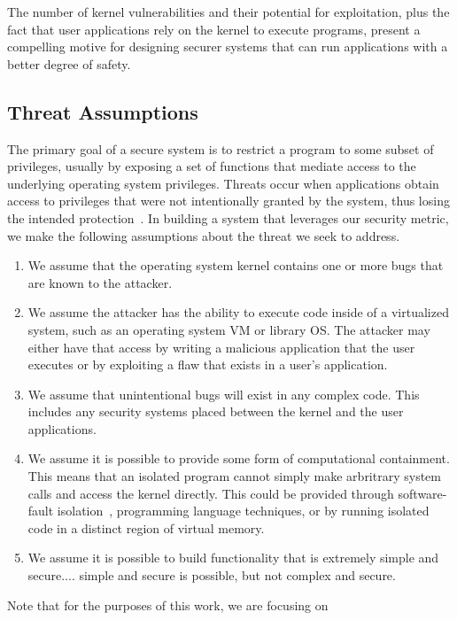 The number of kernel vulnerabilities and their potential for exploitation, 
plus the fact that user applications rely on the kernel to execute
programs, 
present a compelling motive for designing securer systems that can run
applications with a better degree of safety. 

\subsection{Threat Assumptions}

The primary goal of a secure system is to restrict a program to some subset
of privileges, 
usually by exposing a set of functions that mediate access to the
underlying operating system privileges. 
Threats occur when applications obtain access to privileges that were not
intentionally granted by the system, 
thus losing the intended protection~\cite{Repy-10}. In building a system
that leverages our security metric, 
we make the following assumptions about the threat we seek to address.

\begin{enumerate}
\item We assume that the operating system kernel contains one or more bugs 
that are known to the attacker.

\item We assume the attacker has the ability to execute code inside
of a virtualized system, such as an operating system VM or library OS.
The attacker may either have that access by writing a malicious application
that the user executes or by exploiting a flaw that exists in a user's
application.


\item We assume that unintentional bugs will exist in any complex code.  This
includes any security systems placed between the kernel and the user
applications.

\item We assume it is possible to provide some form of computational 
containment.  This means that an isolated program cannot simply
make arbritrary system calls and access the kernel directly.  This could
be provided through software-fault isolation~\cite{SFI:93}, programming 
language techniques, or by running isolated code in a
distinct region of virtual memory.

\item We assume it is possible to build functionality that is extremely
simple and secure....
simple and secure is possible, but not complex and secure.

\end{enumerate}

Note that for the purposes of this work, we are focusing on 
